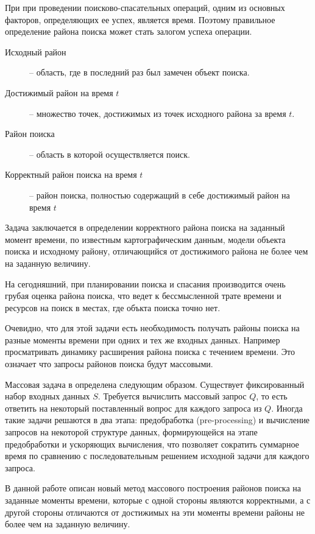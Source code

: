 \startprefacepage

При при проведении поисково-спасательных операций, одним
из основных факторов, определяющих ее успех, является время.
Поэтому правильное определение района поиска может стать залогом
успеха операции.

\begin{description}
\item[Исходный район] -- область, где в последний раз был замечен объект поиска.
\item[Достижимый район на время $t$] -- множество точек, достижимых
из точек исходного района за время $t$.
\item[Район поиска] -- область в которой осуществляется поиск.
\item[Корректный район поиска на время $t$] -- район поиска, полностью
содержащий в себе достижимый район на время $t$
\end{description}

Задача заключается в определении корректного района поиска на заданный
момент времени, по известным картографическим данным, модели
объекта поиска и исходному району, отличающийся от достижимого района
не более чем на заданную величину.

На сегодняшний, при планировании поиска и спасания производится
очень грубая оценка района поиска, что ведет к бессмысленной трате
времени и ресурсов на поиск в местах, где объкта поиска точно нет.

Очевидно, что для этой задачи есть необходимость получать
районы поиска на разные моменты времени при одних и тех же
входных данных. Например просматривать динамику расширения района
поиска с течением времени. Это означает что запросы
районов поиска будут массовыми.

Массовая задача в \cite{PrSh} определена следующим образом. Существует
фиксированный набор входных данных $S$. Требуется вычислить массовый
запрос $Q$, то есть ответить на некоторый поставленный вопрос для каждого
запроса из $Q$. Иногда такие задачи решаются в два этапа: предобработка
(pre-processing) и вычисление запросов на некоторой структуре данных,
формирующейся на этапе предобработки и ускоряющих вычисления, что позволяет
сократить суммарное время по сравнению с последовательным решением
исходной задачи для каждого запроса.

В данной работе описан новый метод массового построения районов
поиска на заданные моменты времени, которые с одной стороны являются корректными,
а с другой стороны отличаются от достижимых на эти моменты
времени районы не более чем на заданную величину.

